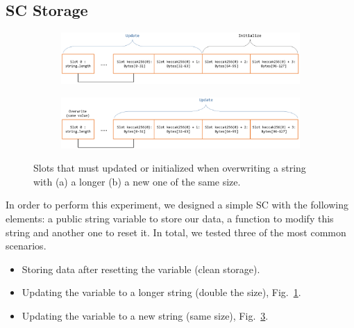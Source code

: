 \subsection{SC Storage}\label{subsection:evaluation_sc}
\begin{figure}[htbp]
    \begin{subfigure}{\linewidth}
        \centerline{\includegraphics[width=\textwidth]{figs/Storage1.pdf}}
        \caption{}
        \label{fig:arrays_1}
    \end{subfigure}
    \begin{subfigure}{\linewidth}
        \centerline{\includegraphics[width=\textwidth]{figs/Storage2.pdf}}
        \caption{}
        \label{fig:arrays_2}
    \end{subfigure}
    \caption{Slots that must updated or initialized when overwriting a string with (a) a longer (b) a new one of the same size.}
\end{figure}

In order to perform this experiment, we designed a simple SC with the following elements: a public string variable to store our data, a function to modify this string and another one to reset it. In total, we tested three of the most common scenarios.

\begin{itemize}[topsep=0pt, itemsep=0pt]
  \item Storing data after resetting the variable (clean storage).
  \item Updating the variable to a longer string (double the size), Fig.~\ref{fig:arrays_1}.
  \item Updating the variable to a new string (same size), Fig.~\ref{fig:arrays_2}.
\end{itemize}

